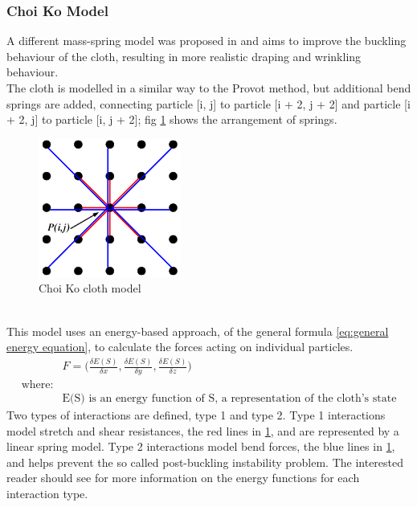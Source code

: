 \subsubsection{Choi Ko Model}
A different mass-spring model was proposed in \textcite{Choi2002} and aims to improve the buckling behaviour of the cloth, resulting in more realistic draping and wrinkling behaviour.
\\The cloth is modelled in a similar way to the Provot method, but additional bend springs are added, connecting particle [i, j] to particle [i + 2, j + 2] and particle [i + 2, j] to particle [i, j + 2]; fig \ref{fig:choi ko model} shows the arrangement of springs.
\begin{figure}[tp]
   \begin{center}
     \includegraphics{Figures/choi_ko_model.png}
   \end{center}
   \caption[Choi Ko cloth model]{Choi Ko cloth model \parencite[2]{Choi2002}}
   \label{fig:choi ko model}
\end{figure}
\\This model uses an energy-based approach, of the general formula \ref{eq:general energy equation}\parencite[3]{Bartels2014}, to calculate the forces acting on individual particles.
\begin{equation}
\begin{split}
\label{eq:general energy equation}
  &F = \bigg(\frac{\delta E(S)}{\delta x}, \frac{\delta E(S)}{\delta y}, \frac{\delta E(S)}{\delta z}\bigg)
  \\\text{where:}
  \\&\text{E(S) is an energy function of S, a representation of the cloth's state}
\end{split}
\end{equation}
Two types of interactions are defined, type 1 and type 2. Type 1 interactions model stretch and shear resistances, the red lines in \ref{fig:choi ko model}, and are represented by a linear spring model. Type 2 interactions model bend forces, the blue lines in \ref{fig:choi ko model}, and helps prevent the so called post-buckling instability problem. The interested reader should see \textcite{Choi2002} for more information on the energy functions for each interaction type.

